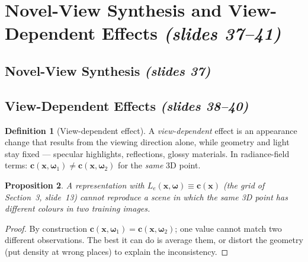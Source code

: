 \documentclass[11pt,a4paper]{article}
\newcommand{\sref}[1]{\texorpdfstring{\emph{(slides #1)}}{(slides #1)}}
\newcommand{\om}{\boldsymbol{\omega}}
\newcommand{\cc}{\boldsymbol{c}}
\newcommand{\xx}{\boldsymbol{x}}
\newcommand{\Le}{L_e}
\theoremstyle{definition}
\newtheorem{definition}{Definition}[section]
\theoremstyle{plain}
\newtheorem{proposition}[definition]{Proposition}
\theoremstyle{remark}
\begin{document}
\section{Novel-View Synthesis and View-Dependent Effects \sref{37--41}}

\subsection{Novel-View Synthesis \sref{37}}


\subsection{View-Dependent Effects \sref{38--40}}

\begin{definition}[View-dependent effect]
A \emph{view-dependent} effect is an appearance change that results from the viewing direction alone, while geometry and light stay fixed --- specular highlights, reflections, glossy materials. In radiance-field terms: $\cc(\xx,\om_1)\neq\cc(\xx,\om_2)$ for the \emph{same} 3D point.
\end{definition}

\begin{proposition}
A representation with $\Le(\xx,\om)\equiv\cc(\xx)$ (the grid of Section~3, slide~13) cannot reproduce a scene in which the same 3D point has different colours in two training images.
\end{proposition}
\begin{proof}
By construction $\cc(\xx,\om_1)=\cc(\xx,\om_2)$; one value cannot match two different observations. The best it can do is average them, or distort the geometry (put density at wrong places) to explain the inconsistency.
\end{proof}
\end{document}

